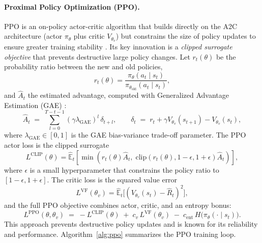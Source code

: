 \paragraph{Proximal Policy Optimization (PPO).}
PPO is an on-policy actor-critic algorithm that builds directly on the A2C architecture (actor $\pi_\theta$ plus critic $V_{\theta_v}$) but constrains the size of policy updates to ensure greater training stability \cite{Schulman2017}. Its key innovation is a \emph{clipped surrogate objective} that prevents destructive large policy changes. Let $r_t(\theta)$ be the probability ratio between the new and old policies,
\begin{equation}\label{eq:ppo_ratio}
r_t(\theta) = \frac{\pi_\theta(a_t \mid s_t)}{\pi_{\theta_{\text{old}}}(a_t \mid s_t)},
\end{equation}
and $\hat{A}_t$ the estimated advantage, computed with Generalized Advantage Estimation (GAE) \cite{Schulman2016}:
\begin{equation}\label{eq:gae}
\hat{A}_t \;=\; \sum_{l=0}^{T-t-1} (\gamma \lambda_{\text{GAE}})^{l}\, \delta_{t+l}, \qquad \delta_t \;=\; r_t + \gamma V_{\theta_v}(s_{t+1}) - V_{\theta_v}(s_t),
\end{equation}
where $\lambda_{\text{GAE}} \in [0,1]$ is the GAE bias-variance trade-off parameter. The PPO actor loss is the clipped surrogate
\begin{equation}\label{eq:ppo_clip}
L^{\mathrm{CLIP}}(\theta) = \hat{\mathbb{E}}_t \left[ \min \left( r_t(\theta)\hat{A}_t,\; \mathrm{clip}\!\left(r_t(\theta), 1-\epsilon, 1+\epsilon\right)\hat{A}_t \right) \right],
\end{equation}
where $\epsilon$ is a small hyperparameter that constrains the policy ratio to $[1-\epsilon, 1+\epsilon]$. The critic loss is the squared value error
\begin{equation}\label{eq:ppo_vf}
L^{\mathrm{VF}}(\theta_v) = \hat{\mathbb{E}}_t\big[(V_{\theta_v}(s_t) - \hat{R}_t)^2\big],
\end{equation}
and the full PPO objective combines actor, critic, and an entropy bonus:
\begin{equation}\label{eq:ppo_objective}
L^{\mathrm{PPO}}(\theta, \theta_v) \;=\; -L^{\mathrm{CLIP}}(\theta) \;+\; c_v\, L^{\mathrm{VF}}(\theta_v) \;-\; c_{\mathrm{ent}}\, H\big(\pi_\theta(\cdot \mid s_t)\big).
\end{equation}
This approach prevents destructive policy updates and is known for its reliability and performance. Algorithm~\ref{alg:ppo} summarizes the PPO training loop.

